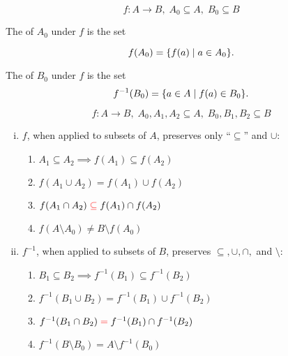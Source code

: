 \begin{frame}{}
  \[
    f: A \to B,\; A_0 \subseteq A,\; B_0 \subseteq B
  \]

  \begin{definition}[Image]
    The  of $A_0$ under $f$ is the set

    \[
      f(A_0) = \{f(a) \mid a \in A_0\}.
    \]
  \end{definition}

  \vspace{0.60cm}
  \begin{definition}
    The  of $B_0$ under $f$ is the set
    \[
      f^{-1}(B_0) = \{a \in A \mid f(a) \in B_0\}.
    \]
  \end{definition}
\end{frame}

\begin{frame}{}
  \begin{theorem}
    \[
      f: A \to B,\; A_0, A_1, A_2 \subseteq A,\; B_0, B_1, B_2 \subseteq B
    \]

    \vspace{-0.10cm}
    \begin{enumerate}[(i)]
      \setlength{\itemsep}{8pt}
      \item $f$, when applied to subsets of $A$, preserves only ``$\subseteq$'' and $\cup$:
	\begin{enumerate}[(1)]
	  \setlength{\itemsep}{4pt}
	  \item $A_1 \subseteq A_2 \implies f(A_1) \subseteq f(A_2)$
	  \item $f(A_1 \cup A_2) = f(A_1) \cup f(A_2)$
	  \item $f(A_1 \cap A_2) \textcolor{red}{\;\subseteq\;} f(A_1) \cap f(A_2)$
	  \item $f(A \setminus A_0) \neq B \setminus f(A_0)$
	\end{enumerate}
      \item $f^{-1}$, when applied to subsets of $B$, preserves $\subseteq, \cup, \cap,$ and $\setminus$:
	\begin{enumerate}[(1)]
	  \setlength{\itemsep}{4pt}
	  \setcounter{enumii}{4}
	  \item $B_1 \subseteq B_2 \implies f^{-1}(B_1) \subseteq f^{-1}(B_2)$
	  \item $f^{-1}(B_1 \cup B_2) = f^{-1}(B_1) \cup f^{-1}(B_2)$
	  \item $f^{-1}(B_1 \cap B_2) \textcolor{red}{\;=\;} f^{-1}(B_1) \cap f^{-1}(B_2)$
	  \item $f^{-1}(B \setminus B_0) = A \setminus f^{-1}(B_0)$
	\end{enumerate}
    \end{enumerate}
  \end{theorem}
\end{frame}

